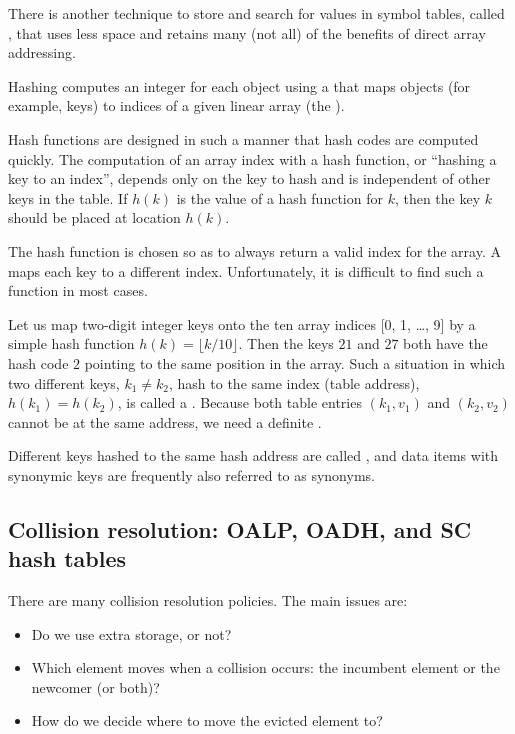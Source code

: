There is another technique to store and search for
values in symbol tables, called {}, that uses less space and 
retains many (not all) of the benefits of direct array addressing. 

\begin{Definition}
Hashing computes an integer  for each object using a 
 that maps objects (for example, keys) to indices of 
a given linear array (the ). 
\end{Definition}

Hash functions are designed in such a manner that hash codes are
computed quickly. The computation  of an array index with 
a hash function, or ``hashing a key to an index'',
depends only on the key to hash and is independent of other keys in the table.
 If \(h(k)\) is the value of a hash function for $k$, then the
 key \(k\) should be placed at location \(h(k)\).

The hash function is chosen so as to always return a valid index 
for the array. A  maps each key to a different 
index. Unfortunately, it is difficult to find such a function in most cases. 

\begin{Example} \label{exm:hashing}
Let us map two-digit integer keys onto the ten array indices 
[0, 1, \ldots, 9] by a
simple hash function \(h(k) = \lfloor k/10 \rfloor\). Then the keys \(21\) and
\(27\) both have the hash code \(2\) pointing to
the same position in the array. Such a situation in which two different keys, 
\(k_{1} \ne k_{2}\), hash to the same index (table address), 
\(h(k_{1}) = h(k_{2})\), is called a . Because both
table entries \((k_{1},v_{1})\) and \((k_{2},v_{2})\) cannot
be at the same address, we need a  definite {}. 
\end{Example}

Different keys hashed to the same hash address are  called , 
and data items with synonymic keys are frequently also referred to as 
synonyms. 

\subsection{Collision resolution: OALP, OADH, and SC hash tables}

There are many collision resolution policies. The main issues are:

\begin{itemize}
\item Do we use extra storage, or not?
\item Which element moves when a collision occurs: the incumbent element or the 
newcomer (or both)?
\item How do we decide where to move the evicted element to?
\end{itemize}

